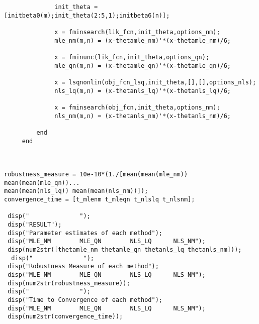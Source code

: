 \documentclass[10pt, letterpaper]{article}
\begin{document}
\begin{verbatim}
              init_theta = [initbeta0(m);init_theta(2:5,1);initbeta6(n)];
              
              x = fminsearch(lik_fcn,init_theta,options_nm);
              mle_nm(m,n) = (x-thetamle_nm)'*(x-thetamle_nm)/6;
              
              x = fminunc(lik_fcn,init_theta,options_qn);
              mle_qn(m,n) = (x-thetamle_qn)'*(x-thetamle_qn)/6;
              
              x = lsqnonlin(obj_fcn_lsq,init_theta,[],[],options_nls);
              nls_lq(m,n) = (x-thetanls_lq)'*(x-thetanls_lq)/6;
              
              x = fminsearch(obj_fcn,init_theta,options_nm);
              nls_nm(m,n) = (x-thetanls_nm)'*(x-thetanls_nm)/6;
                  
         end         
     end
 


robustness_measure = 10e-10*(1./[mean(mean(mle_nm)) mean(mean(mle_qn))...
mean(mean(nls_lq)) mean(mean(nls_nm))]);
convergence_time = [t_mlenm t_mleqn t_nlslq t_nlsnm];

 disp("              ");
 disp("RESULT");
 disp("Parameter estimates of each method");
 disp("MLE_NM        MLE_QN        NLS_LQ      NLS_NM");
 disp(num2str([thetamle_nm thetamle_qn thetanls_lq thetanls_nm]));
  disp("              ");
 disp("Robustness Measure of each method");
 disp("MLE_NM        MLE_QN        NLS_LQ      NLS_NM");
 disp(num2str(robustness_measure));
 disp("              ");
 disp("Time to Convergence of each method");
 disp("MLE_NM        MLE_QN        NLS_LQ      NLS_NM");
 disp(num2str(convergence_time));



\end{verbatim}
                     
\end{document}
